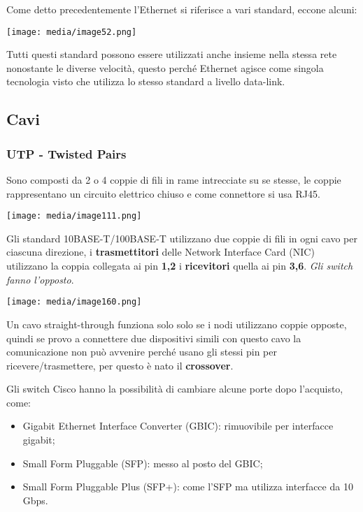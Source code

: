 Come detto precedentemente l'Ethernet si riferisce a vari standard,
eccone alcuni:

\texttt{[image: media/image52.png]}

Tutti questi standard possono essere utilizzati anche insieme nella
stessa rete nonostante le diverse velocità, questo perché Ethernet
agisce come singola tecnologia visto che utilizza lo stesso standard a
livello data-link.

\subsection{Cavi}\label{cavi}

\subsubsection{UTP - Twisted Pairs}\label{utp---twisted-pairs}

Sono composti da 2 o 4 coppie di fili in rame intrecciate su se stesse,
le coppie rappresentano un circuito elettrico chiuso e come connettore
si usa RJ45.

\texttt{[image: media/image111.png]}

Gli standard 10BASE-T/100BASE-T utilizzano due coppie di fili in ogni
cavo per ciascuna direzione, i \textbf{trasmettitori} delle Network
Interface Card (NIC) utilizzano la coppia collegata ai pin \textbf{1,2}
i \textbf{ricevitori} quella ai pin \textbf{3,6}. \emph{Gli switch fanno
l'opposto}.

\texttt{[image: media/image160.png]}

Un cavo straight-through funziona solo solo se i nodi utilizzano coppie
opposte, quindi se provo a connettere due dispositivi simili con questo
cavo la comunicazione non può avvenire perché usano gli stessi pin per
ricevere/trasmettere, per questo è nato il \textbf{crossover}.

Gli switch Cisco hanno la possibilità di cambiare alcune porte dopo
l'acquisto, come:

\begin{itemize}
\item
  Gigabit Ethernet Interface Converter (GBIC): rimuovibile per
  interfacce gigabit;
\item
  Small Form Pluggable (SFP): messo al posto del GBIC;
\item
  Small Form Pluggable Plus (SFP+): come l'SFP ma utilizza interfacce da
  10 Gbps.
\end{itemize}

